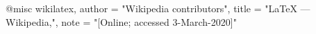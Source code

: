 @misc{ wikilatex,
author = "{Wikipedia contributors}",
title = "LaTeX --- {Wikipedia}{,}",
note = "[Online; accessed 3-March-2020]"
}
